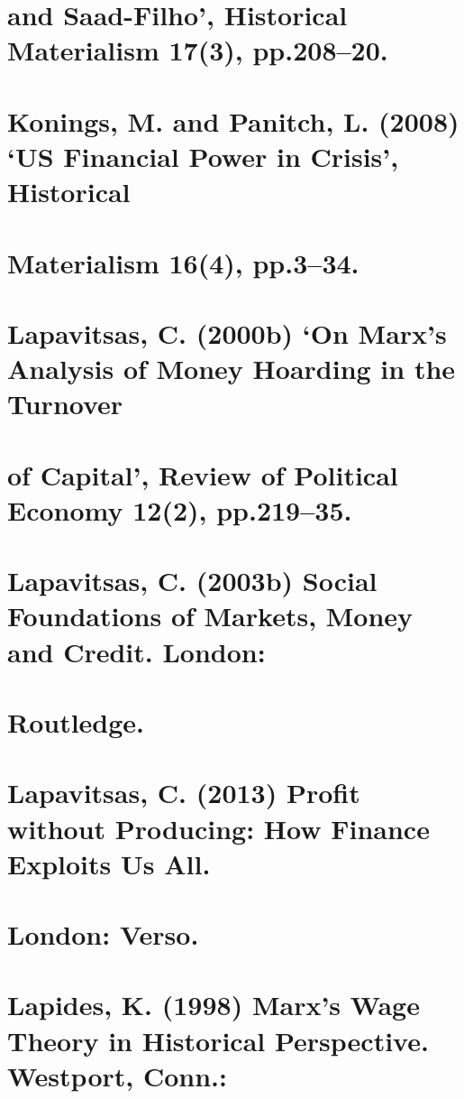 \section{and Saad-Filho’, Historical Materialism 17(3), pp.208–20.}


\section{Konings, M. and Panitch, L. (2008) ‘US Financial Power in Crisis’, Historical}


\section{Materialism 16(4), pp.3–34.}


\section{Lapavitsas, C. (2000b) ‘On Marx’s Analysis of Money Hoarding in the Turnover}


\section{of Capital’, Review of Political Economy 12(2), pp.219–35.}


\section{Lapavitsas, C. (2003b) Social Foundations of Markets, Money and Credit. London:}


\section{Routledge.}


\section{Lapavitsas, C. (2013) Profit without Producing: How Finance Exploits Us All.}


\section{London: Verso.}


\section{Lapides, K. (1998) Marx’s Wage Theory in Historical Perspective. Westport, Conn.:}


